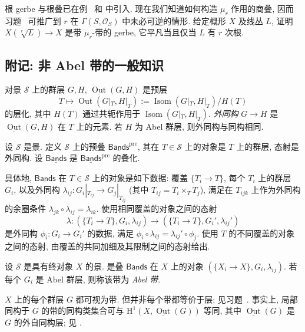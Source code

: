 \begin{exercise}\label{src:7.4.26}
根 gerbe 与根叠已在例~ 和  中引入. 现在我们知道如何构造 $\mu_r$ 作用的商叠, 因而习题~ 可推广到 $r$ 在 $\Gamma(S,\mathcal O_S)$ 中未必可逆的情形. 给定概形 $X$ 及线丛 $L$, 证明 $X(\sqrt[r]{L})\to X$ 是带 $\mu_r$-带的 gerbe, 它平凡当且仅当 $L$ 有 $r$ 次根.
\end{exercise}
\subsection{附记: 非 Abel 带的一般知识}\label{src:7.4.4-subsection}
对景 $\mathcal S$ 上的群层 $G,H$,  $\underline{\operatorname{Out}}(G,H)$ 是预层
\[
T\longmapsto\operatorname{Out}(G|_T,H|_T):=\operatorname{Isom}(G|_T,H|_T)/H(T)
\]
的层化, 其中 $H(T)$ 通过共轭作用于 $\operatorname{Isom}(G|_T,H|_T)$. \emph{外同构} $G\to H$ 是 $\underline{\operatorname{Out}}(G,H)$ 在 $T$ 上的元素. 若 $H$ 为 Abel 群层, 则外同构与同构相同.
\begin{definition}[带的叠]\label{src:7.4.27}
设 $\mathcal S$ 是景. 定义 $\mathcal S$ 上的预叠 $\underline{\mathsf{Bands}}^{\mathrm{pre}}$, 其在 $T\in\mathcal S$ 上的对象是 $T$ 上的群层, 态射是外同构. 设 $\underline{\mathsf{Bands}}$ 是 $\underline{\mathsf{Bands}}^{\mathrm{pre}}$ 的叠化.
\end{definition}
\begin{remark}\label{src:7.4.28}
具体地, $\underline{\mathsf{Bands}}$ 在 $T\in\mathcal S$ 上的对象是如下数据: 覆盖 $\{T_i\to T\}$, 每个 $T_i$ 上的群层 $G_i$, 以及外同构 $\lambda_{ij}:G_i|_{T_{ij}}\to G_j|_{T_{ij}}$ (其中 $T_{ij}=T_i\times_T T_j$), 满足在 $T_{ijk}$ 上作为外同构的余圈条件 $\lambda_{jk}\circ\lambda_{ij}=\lambda_{ik}$. 使用相同覆盖的对象之间的态射
\[
\lambda:(\{T_i\to T\},G_i,\lambda_{ij})\longrightarrow(\{T_i\to T\},G_i',\lambda_{ij}')
\]
是外同构 $\phi_i:G_i\to G_i'$ 的数据, 满足 $\phi_i\circ\lambda_{ij}=\lambda_{ij}'\circ\phi_j$. 使用 $T$ 的不同覆盖的对象之间的态射, 由覆盖的共同加细及其限制之间的态射给出.
\end{remark}
\begin{definition}[带]\label{src:7.4.29}
设 $\mathcal S$ 是具有终对象 $X$ 的景.  是叠 $\underline{\mathsf{Bands}}$ 在 $X$ 上的对象 $(\{X_i\to X\},G_i,\lambda_{ij})$. 若每个 $G_i$ 是 Abel 群层, 则称该带为 \emph{Abel 带}.
\end{definition}
\begin{remark}\label{src:7.4.30}
$X$ 上的每个群层 $G$ 都可视为带. 但并非每个带都等价于层; 见习题~. 事实上, 局部同构于 $G$ 的带的同构类集合可与 $\mathrm H^1(X,\underline{\operatorname{Out}}(G))$ 等同, 其中 $\underline{\operatorname{Out}}(G)$ 是 $G$ 的外自同构层; 见 \cite[推论 IV.1.1.7.3]{Gir71}.
\end{remark}
